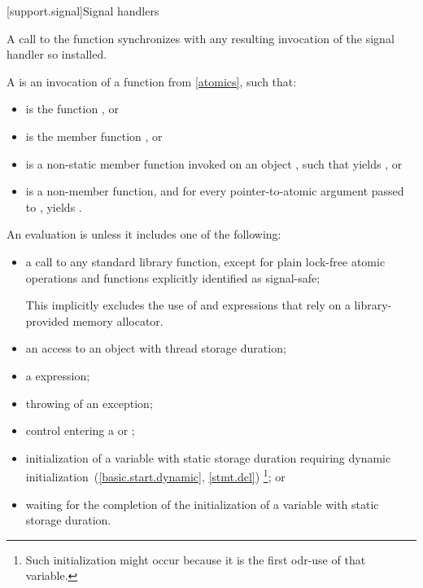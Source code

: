 [support.signal]{Signal handlers}

\pnum
A call to the function  synchronizes with any resulting
invocation of the signal handler so installed.

\pnum
A  is
an invocation of a function  from \ref{atomics},
such that:
\begin{itemize}
\item
{} is the function , or

\item
{} is the member function , or

\item
{} is a non-static member function invoked on an object ,
such that  yields , or

\item
{} is a non-member function, and
for every pointer-to-atomic argument  passed to ,
 yields .
\end{itemize}

\pnum
{}%
An evaluation is  unless it includes one of the following:
\begin{itemize}
\item
a call to any standard library function,
except for plain lock-free atomic operations and
functions explicitly identified as signal-safe;
\begin{note}
This implicitly excludes the use of  and  expressions
that rely on a library-provided memory allocator.
\end{note}

\item
an access to an object with thread storage duration;

\item
a  expression;

\item
throwing of an exception;

\item
control entering a  or ;

\item
initialization of a variable with static storage duration
requiring dynamic initialization~(\ref{basic.start.dynamic}, \ref{stmt.dcl})%
\footnote{Such initialization might occur because it is the first odr-use of that variable.}; or

\item
waiting for the completion of the initialization of a variable with static storage duration.
\end{itemize}

